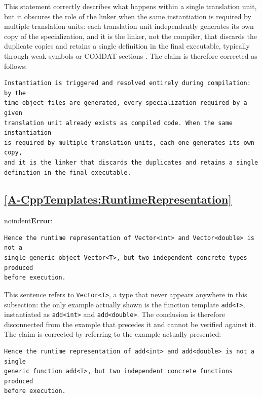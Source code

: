 \documentclass[11pt]{report}
\begin{document}
This statement correctly describes what happens within a single translation
unit, but it obscures the role of the linker when the same instantiation is
required by multiple translation units: each translation unit independently
generates its own copy of the specialization, and it is the linker, not the
compiler, that discards the duplicate copies and retains a single definition in
the final executable, typically through weak symbols or COMDAT sections
\cite{itanium_abi}. The claim is therefore corrected as follows:

\begin{Verbatim}[breaklines=true]
Instantiation is triggered and resolved entirely during compilation: by the
time object files are generated, every specialization required by a given
translation unit already exists as compiled code. When the same instantiation
is required by multiple translation units, each one generates its own copy,
and it is the linker that discards the duplicates and retains a single
definition in the final executable.
\end{Verbatim}

\subsection*{\hyperref[A-CppTemplates:RuntimeRepresentation]{\ref*{A-CppTemplates:RuntimeRepresentation} }}

noindent\textbf{Error}:

\begin{Verbatim}[breaklines=true]
Hence the runtime representation of Vector<int> and Vector<double> is not a
single generic object Vector<T>, but two independent concrete types produced
before execution.
\end{Verbatim}

This sentence refers to \texttt{Vector<T>}, a type that never appears anywhere
in this subsection: the only example actually shown is the function template
\texttt{add<T>}, instantiated as \texttt{add<int>} and \texttt{add<double>}.
The conclusion is therefore disconnected from the example that precedes it and
cannot be verified against it. The claim is corrected by referring to the
example actually presented:

\begin{Verbatim}[breaklines=true]
Hence the runtime representation of add<int> and add<double> is not a single
generic function add<T>, but two independent concrete functions produced
before execution.
\end{Verbatim}
\end{document}
